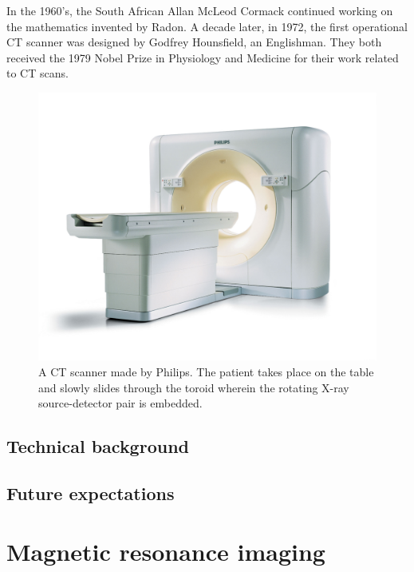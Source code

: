 In the 1960's, the South African Allan McLeod Cormack continued working on
the mathematics invented by Radon. A decade later, in 1972, the first
operational CT scanner was designed by Godfrey Hounsfield, an Englishman. They
both received the 1979 Nobel Prize in Physiology and Medicine for their work
related to CT scans.


\begin{figure}[ht]
\begin{center}
  \includegraphics[width=\linewidth]{img/ctscanner.jpg}
  \caption{A CT scanner made by Philips. The patient takes place on the table
  and slowly slides through the toroid wherein the rotating X-ray
  source-detector pair is embedded.}
  \label{fig:ctscanner}
\end{center}
\end{figure}

\subsection{Technical background}

\subsection{Future expectations}

\section{Magnetic resonance imaging}

